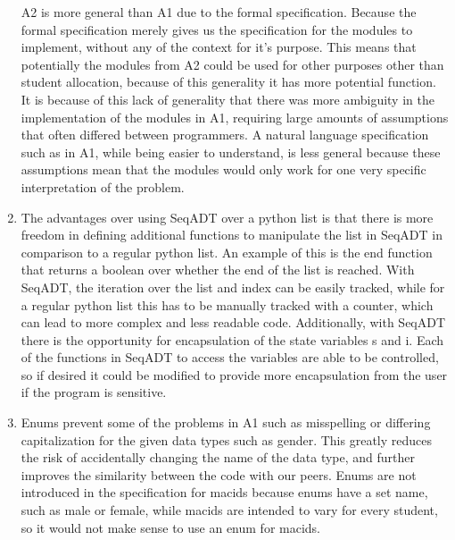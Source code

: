 \documentclass[12pt]{article}
\begin{document}
\begin{enumerate}
A2 is more general than A1 due to the formal specification. Because the formal specification merely gives us the specification for the modules to implement, without any of the context for it's purpose. This means that potentially the modules from A2 could be used for other purposes other than student allocation, because of this generality it has more potential function. It is because of this lack of generality that there was more ambiguity in the implementation of the modules in A1, requiring large amounts of assumptions that often differed between programmers. A natural language specification such as in A1, while being easier to understand, is less general because these assumptions mean that the modules would only work for one very specific interpretation of the problem.

\item

The advantages over using SeqADT over a python list is that there is more freedom in defining additional functions to manipulate the list in SeqADT in comparison to a regular python list. An example of this is the end function that returns a boolean over whether the end of the list is reached. With SeqADT, the iteration over the list and index can be easily tracked, while for a regular python list this has to be manually tracked with a counter, which can lead to more complex and less readable code. Additionally, with SeqADT there is the opportunity for encapsulation of the state variables s and i. Each of the functions in SeqADT to access the variables are able to be controlled, so if desired it could be modified to provide more encapsulation from the user if the program is sensitive.

\item

Enums prevent some of the problems in A1 such as misspelling or differing capitalization for the given data types such as gender. This greatly reduces the risk of accidentally changing the name of the data type, and further improves the similarity between the code with our peers. Enums are not introduced in the specification for macids because enums have a set name, such as male or female, while macids are intended to vary for every student, so it would not make sense to use an enum for macids.



\end{enumerate}

\newpage

\lstset{language=Python, basicstyle=\tiny, breaklines=true, showspaces=false,
  showstringspaces=false, breakatwhitespace=true}
\lstset{language=C,linewidth=.94\textwidth,xleftmargin=1.1cm}
\end{document}
